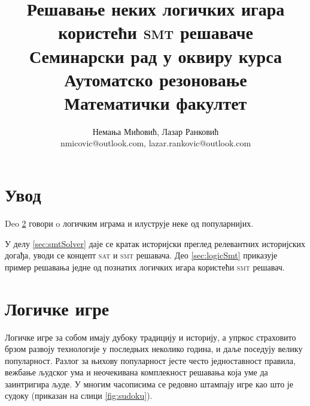\documentclass[a4paper]{article}
\begin{document}
\title{Решавање неких логичких игара користећи \textsc{smt} решаваче\\ \small{Семинарски рад у оквиру курса\\Аутоматско резоновање\\ Математички факултет}}

\author{Немања Мићовић, Лазар Ранковић\\nmicovic@outlook.com, lazar.rankovic@outlook.com}
\date{}
\maketitle


\tableofcontents

\newpage
\section{Увод}
\label{sec:intro}
Deo \ref{sec:logicGames} говори o логичким играма и илуструје неке од популарнијих.

У делу \ref{sec:smtSolver} даје се кратак историјски преглед релевантних историјских догађа,
уводи се концепт \textsc{sat} и \textsc{smt} решавача.
Део \ref{sec:logicSmt} приказује пример решавања једне од познатих логичких игара користећи \textsc{smt} решавач.

\section{Логичке игре}
\label{sec:logicGames}
Логичке игре за собом имају дубоку традицију и историју, а упркос страховито брзом развоју технологије у последњих
неколико година, и даље поседују велику популарност. Разлог за њихову популарност јесте често једноставност правила,
вежбање људског ума и неочекивана комплекност решавања која уме да заинтригира људе.
У многим часописима се редовно штампају игре као што је судоку (приказан на слици \ref{fig:sudoku}). 
\end{document}
